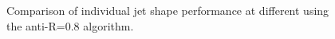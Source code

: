 \begin{figure}
\caption{Comparison of individual jet shape performance at different \pt using the anti-\kT R=0.8 algorithm.}
\label{fig:ptcomparison_singleshape_top}
\end{figure}

%

